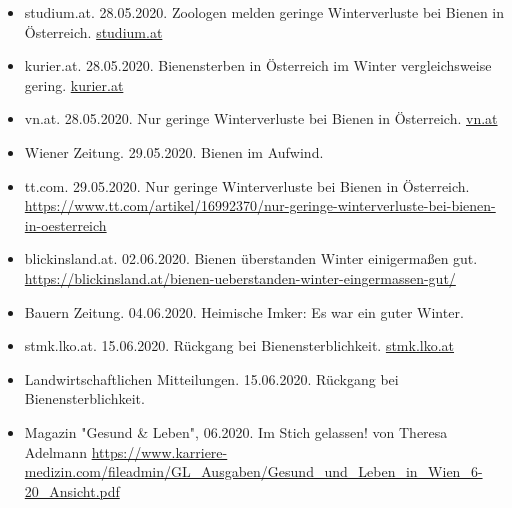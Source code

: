 \begin{itemize}
    \item
    studium.at. 28.05.2020. Zoologen melden geringe Winterverluste bei Bienen in Österreich. \href{https://www.studium.at/zoologen-melden-geringe-winterverluste-bei-bienen-oesterreich}{studium.at}
    
    \item
    kurier.at. 28.05.2020. Bienensterben in Österreich im Winter vergleichsweise gering. \href{https://kurier.at/chronik/oesterreich/bienensterben-in-oesterreich-im-winter-vergleichsweise-gering/400854374}{kurier.at}
    
    \item
    vn.at. 28.05.2020. Nur geringe Winterverluste bei Bienen in Österreich. \href{https://www.vn.at/newsticker/nur-geringe-winterverluste-bei-bienen-in-oesterreich/1852978}{vn.at}
    
    \item
    Wiener Zeitung. 29.05.2020. Bienen im Aufwind.
    
    \item
    tt.com. 29.05.2020. Nur geringe Winterverluste bei Bienen in Österreich. \url{https://www.tt.com/artikel/16992370/nur-geringe-winterverluste-bei-bienen-in-oesterreich}
    
    \item
    blickinsland.at. 02.06.2020. Bienen überstanden Winter einigermaßen gut. \url{https://blickinsland.at/bienen-ueberstanden-winter-eingermassen-gut/}
    
    \item
    Bauern Zeitung. 04.06.2020. Heimische Imker: Es war ein guter Winter. 
    
    \item
    stmk.lko.at. 15.06.2020. Rückgang bei Bienensterblichkeit.
    \href{https://stmk.lko.at/landwirtschaftliche-mitteilungen-vom-15-juni-2020+2500+3228498}{stmk.lko.at}
    
    \item
    Landwirtschaftlichen Mitteilungen. 15.06.2020. Rückgang bei Bienensterblichkeit.
    
    \item
    Magazin "Gesund \& Leben", 06.2020. Im Stich gelassen! von Theresa Adelmann \url{https://www.karriere-medizin.com/fileadmin/GL_Ausgaben/Gesund_und_Leben_in_Wien_6-20_Ansicht.pdf}

\end{itemize}